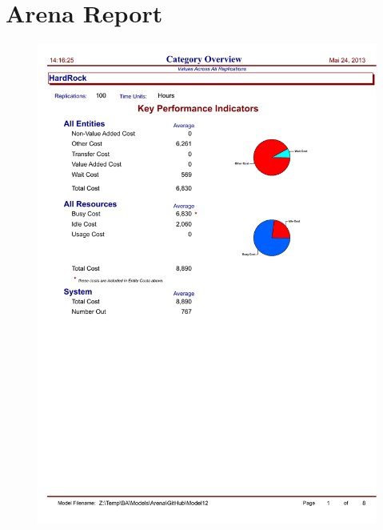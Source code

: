 \documentclass[ngerman,a4paper,12pt]{scrreprt}
\begin{document}
\chapter{Arena Report}
	\begin{figure}[H]
		\begin{center}
			\includegraphics[page=1, trim=0cm 10cm 0cm 0cm, clip=true, width=\textwidth]{../Auswertung/Raport 14-3-9/category overview.pdf}
		\end{center}
	\end{figure}
\end{document}
